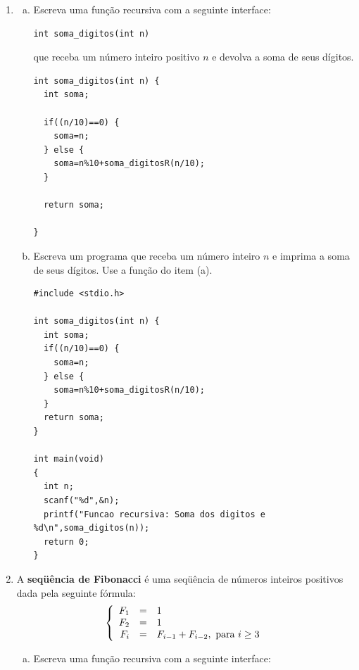 \documentclass[a4paper,10pt]{article}
\begin{document}
\begin{enumerate}

\item 
\begin{enumerate}[(a)]

\item Escreva uma função recursiva com a seguinte interface:\\

\begin{lstlisting}
int soma_digitos(int n)
\end{lstlisting}

que receba um número inteiro positivo $n$ e devolva a soma de seus dígitos.\\

\begin{lstlisting}
int soma_digitos(int n) {
  int soma;

  if((n/10)==0) {
    soma=n;
  } else {
    soma=n%10+soma_digitosR(n/10);
  }

  return soma;

}
\end{lstlisting}

\item Escreva um programa que receba um número inteiro $n$ 
e imprima a soma de seus dígitos. Use a função do item (a).\\

\begin{lstlisting}
#include <stdio.h>

int soma_digitos(int n) {
  int soma;
  if((n/10)==0) {
    soma=n;
  } else {
    soma=n%10+soma_digitosR(n/10);
  }
  return soma;
}

int main(void)
{
  int n;
  scanf("%d",&n);
  printf("Funcao recursiva: Soma dos digitos e %d\n",soma_digitos(n));
  return 0;
}
\end{lstlisting}
\end{enumerate} %
\pagebreak

\item  A \textbf{seqüência de Fibonacci} é uma seqüência de números inteiros positivos dada pela seguinte fórmula:
  \[ 
  \left\{ \begin{array}{rcl}
    F_1 & = & 1 \\
    F_2 & = & 1 \\
    F_i & = & F_{i-1} + F_{i-2},\ \textnormal{para}\ i\geq 3 
  \end{array}
  \right. 
  \]

\begin{enumerate}[(a)]
\item Escreva uma função recursiva com a seguinte interface:


\end{enumerate}
\end{enumerate}
\end{document}
